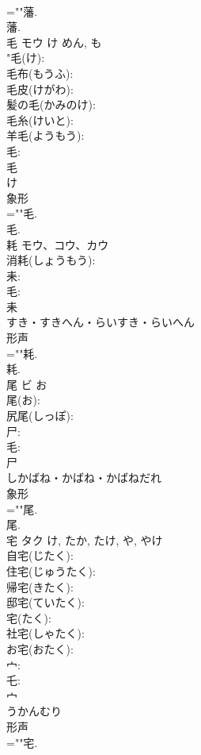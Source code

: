 \documentclass[8pt]{extreport}
\begin{document}
\begin{CJK}{UTF8}{min}
\\	=""藩.
\\	藩.
\\	毛	モウ	け	めん, も	
\\	"毛(け): 
\\	毛布(もうふ): 
\\	毛皮(けがわ): 
\\	髪の毛(かみのけ): 
\\	毛糸(けいと): 
\\	羊毛(ようもう): 
\\	毛: 
\\	毛	
\\	け	
\\	象形 
\\	=""毛.
\\	毛.
\\	耗	モウ、コウ、カウ			
\\	消耗(しょうもう): 
\\	耒: 
\\	毛: 
\\	耒	
\\	すき・すきへん・らいすき・らいへん	
\\	形声 
\\	=""耗.
\\	耗.
\\	尾	ビ	お		
\\	尾(お): 
\\	尻尾(しっぽ): 
\\	尸: 
\\	毛: 
\\	尸	
\\	しかばね・かばね・かばねだれ	
\\	象形 
\\	=""尾.
\\	尾.
\\	宅	タク		け, たか, たけ, や, やけ	
\\	自宅(じたく): 
\\	住宅(じゅうたく): 
\\	帰宅(きたく): 
\\	邸宅(ていたく): 
\\	宅(たく): 
\\	社宅(しゃたく): 
\\	お宅(おたく): 
\\	宀: 
\\	乇: 
\\	宀	
\\	うかんむり	
\\	形声 
\\	=""宅.

\end{CJK}
\end{document}
